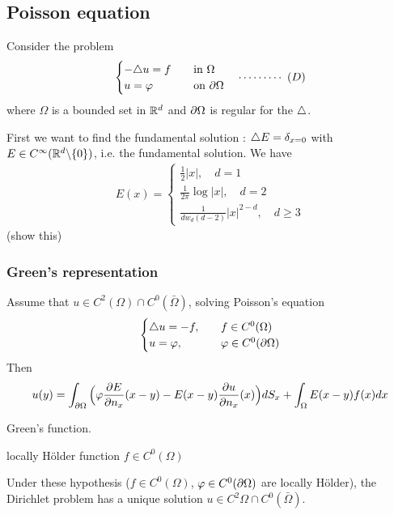 \documentclass[10pt,a4paper]{article}
\begin{document}
\subsection*{Poisson equation}

Consider the problem
\begin{align*}
\begin{cases}
-\triangle u =f \quad &\text{in }\Omega \\
u=\varphi \quad &\text{on } \partial \Omega
\end{cases} \quad \cdots\cdots\cdots\,\,(D)
\end{align*}
where $\Omega$ is a bounded set in $\mathbb{R}^d$ and $\partial \Omega$ is regular for the $\triangle$.

\quad First we want to find the fundamental solution : $\triangle E =\delta_{x=0}$ with $E\in C^{\infty} (\mathbb{R}^d \backslash \{0\})$, i.e. the fundamental solution. We have
\begin{align*}
E(x) = \begin{cases}
\frac{1}{2} |x|, \quad d=1\\
\frac{1}{2\pi} \log |x|, \quad d=2\\
\frac{1}{dw_d (d-2)}|x|^{2-d}, \quad d\geq 3
\end{cases}
\end{align*}
(show this)
\s

\subsubsection*{Green's representation}

 Assume that $u\in C^2(\Omega)\cap C^0(\bar{\Omega})$, solving Poisson's equation
\begin{align*}
\begin{cases}
\triangle u = - f, \quad &f \in C^0(\Omega)\\
u = \varphi, \quad &\varphi \in C^0(\partial \Omega)
\end{cases}
\end{align*}
Then
\begin{align*}
u(y) = \int_{\partial \Omega} \Big( \varphi\frac{\partial E}{\partial n_x}(x-y) - E(x-y)\frac{\partial u}{\partial n_x}(x) \Big) dS_x + \int_{\Omega} E(x-y) f(x) dx
\end{align*}
\s

 Green's function.
\s

 locally H\"older function $f\in C^0(\Omega)$
\s

 Under these hypothesis ($f\in C^0(\Omega)$, $\varphi \in C^0(\partial \Omega)$ are locally H\"older), the Dirichlet problem has a unique solution $u\in C^2{\Omega} \cap C^0(\bar{\Omega})$.
\end{document}
